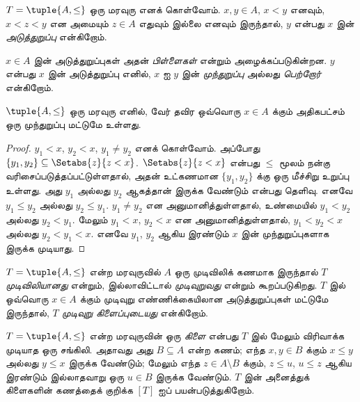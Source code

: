 \documentclass[../../../include/open-logic-section]{subfiles}
\begin{document}
\begin{defn}[அடுத்துறுப்புகள்]
$T = \tuple{A, \le}$ ஒரு மரவுரு எனக் கொள்வோம்.
$x,y \in A$, $x < y$ எனவும், $x < z < y$ என அமையும்
$z \in A$ எதுவும் இல்லை எனவும் இருந்தால், $y$ என்பது $x$ இன்
\emph{அடுத்துறுப்பு} என்கிறோம்.
\end{defn}

$x \in A$ இன் அடுத்துறுப்புகள் அதன் \emph{பிள்ளைகள்} என்றும்
அழைக்கப்படுகின்றன. $y$ என்பது $x$ இன் அடுத்துறுப்பு எனில், $x$ ஐ
$y$ இன் \emph{முந்துறுப்பு} அல்லது \emph{பெற்றோர்} என்கிறோம்.

\begin{prop}
$\tuple{A,\le}$ ஒரு மரவுரு எனில், வேர் தவிர ஒவ்வொரு $x \in A$ க்கும்
அதிகபட்சம் ஒரு முந்துறுப்பு மட்டுமே உள்ளது.
\end{prop}

\begin{proof}
  $y_1 < x$, $y_2 < x$, $y_1 \neq y_2$ எனக் கொள்வோம். அப்போது
  $\{y_1, y_2\} \subseteq \Setabs{z}{z<x}$.
  $\Setabs{z}{z<x}$ என்பது $\le$ மூலம் நன்கு வரிசைப்படுத்தப்பட்டுள்ளதால்,
  அதன் உட்கணமான $\{y_1, y_2\}$ க்கு ஒரு மீச்சிறு உறுப்பு உள்ளது.
  அது $y_1$ அல்லது $y_2$ ஆகத்தான் இருக்க வேண்டும் என்பது தெளிவு.
  எனவே $y_1 \le y_2$ அல்லது $y_2 \le y_1$.
  $y_1 \neq y_2$ என அனுமானித்துள்ளதால், உண்மையில்
  $y_1 < y_2$ அல்லது $y_2 < y_1$.
  மேலும் $y_1 < x$, $y_2 < x$ என அனுமானித்துள்ளதால்,
  $y_1 < y_2 < x$ அல்லது $y_2 < y_1 < x$.
  எனவே $y_1$, $y_2$ ஆகிய இரண்டும் $x$ இன் முந்துறுப்புகளாக இருக்க முடியாது.
\end{proof}

\begin{defn}
$T = \tuple{A, \le}$ என்ற மரவுருவில் $A$ ஒரு முடிவிலிக் கணமாக
இருந்தால் $T$ \emph{முடிவிலியானது} என்றும், இல்லாவிட்டால்
\emph{முடிவுறுவது} என்றும் கூறப்படுகிறது. $T$ இல் ஒவ்வொரு
$x \in A$ க்கும் முடிவுறு எண்ணிக்கையிலான அடுத்துறுப்புகள் மட்டுமே
இருந்தால், $T$ \emph{முடிவுறு கிளைப்புடையது} என்கிறோம்.
\end{defn}

\begin{defn}[கிளைகள்]
$T = \tuple{A, \le}$ என்ற மரவுருவின் ஒரு \emph{கிளை} என்பது $T$
இல் மேலும் விரிவாக்க முடியாத ஒரு சங்கிலி. அதாவது அது
$B \subseteq A$ என்ற கணம்; எந்த $x, y \in B$ க்கும்
$x \le y$ அல்லது $y \le x$ இருக்க வேண்டும்; மேலும் எந்த
$z \in A \setminus B$ க்கும், $z \le u$, $u \le z$ ஆகிய இரண்டும்
இல்லாதவாறு ஒரு $u \in B$ இருக்க வேண்டும்.
%
$T$ இன் அனைத்துக் கிளைகளின் கணத்தைக் குறிக்க $[T]$ ஐப் பயன்படுத்துகிறோம்.
\end{defn}
\end{document}
